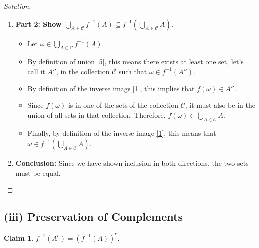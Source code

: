 \documentclass[11pt,a4paper]{article}
\newtheorem{lemma}{Claim}
\newenvironment{solution}{\begin{proof}[Solution]}{\end{proof}}
\begin{document}
\begin{solution}
\begin{enumerate}
    \item \textbf{Part 2: Show $\bigcup_{A \in \mathcal{C}} f^{-1}(A) \subseteq f^{-1}\left(\bigcup_{A \in \mathcal{C}} A\right)$.}
    \begin{itemize}
        \item Let $\omega \in \bigcup_{A \in \mathcal{C}} f^{-1}(A)$.
        \item By definition of union \hyperlink{note5}{[5]}, this means there exists at least one set, let's call it $A''$, in the collection $\mathcal{C}$ such that $\omega \in f^{-1}(A'')$.
        \item By definition of the inverse image \hyperlink{note1}{[1]}, this implies that $f(\omega) \in A''$.
        \item Since $f(\omega)$ is in one of the sets of the collection $\mathcal{C}$, it must also be in the union of all sets in that collection. Therefore, $f(\omega) \in \bigcup_{A \in \mathcal{C}} A$.
        \item Finally, by definition of the inverse image \hyperlink{note1}{[1]}, this means that $\omega \in f^{-1}\left(\bigcup_{A \in \mathcal{C}} A\right)$.
    \end{itemize}

    \item \textbf{Conclusion:} Since we have shown inclusion in both directions, the two sets must be equal.
\end{enumerate}
\end{solution}

\subsection*{(iii) Preservation of Complements}

\begin{lemma}
$f^{-1}(A^c) = (f^{-1}(A))^c$.
\end{lemma}
\end{document}
